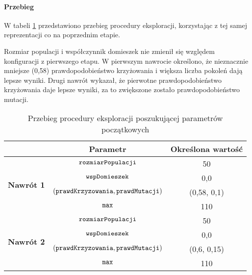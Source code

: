 \documentclass[./FM_mgr.tex]{subfiles}
\begin{document}
\paragraph{Przebieg}

W tabeli \ref{table:tsp_tweak_flow} przedstawiono przebieg procedury eksploracji, korzystając z tej samej reprezentacji co na poprzednim etapie.

Rozmiar populacji i współczynnik domieszek nie zmienił się względem konfiguracji z pierwszego etapu.
W pierwszym nawrocie określono, że nieznacznie mniejsze (0,58) prawdopodobieństwo krzyżowania i większa liczba pokoleń dają lepsze wyniki.
Drugi nawrót wykazał, że pierwotne prawdopodobieństwo krzyżowania daje lepsze wyniki, za to zwiększone zostało prawdopodobieństwo mutacji. 

\begin{table}[h]
	\caption{Przebieg procedury eksploracji poszukującej parametrów początkowych \label{table:tsp_tweak_flow}}
	\centering
	\begin{tabular}{c|c|c|}
		\cline{2-3}
		& {\bf Parametr}                                     & {\bf Określona wartość} \\ \hline
		\multicolumn{1}{|c|}{\multirow{4}{*}{{\bf Nawrót 1}}} & $\mathtt{rozmiarPopulacji}$                         & 50                      \\ \cline{2-3} 
		\multicolumn{1}{|c|}{}                                & $\mathtt{wspDomieszek}$                             & 0,0                     \\ \cline{2-3} 
		\multicolumn{1}{|c|}{}                                & $(\mathtt{prawdKrzyzowania}, \mathtt{prawdMutacji})$ & (0,58, 0,1)             \\ \cline{2-3} 
		\multicolumn{1}{|c|}{}                                & $\mathtt{max}$                                      & 110                     \\ \hline \hline
		\multicolumn{1}{|c|}{\multirow{4}{*}{{\bf Nawrót 2}}} & $\mathtt{rozmiarPopulacji}$                         & 50                      \\ \cline{2-3} 
		\multicolumn{1}{|c|}{}                                & $\mathtt{wspDomieszek}$                             & 0,0                     \\ \cline{2-3} 
		\multicolumn{1}{|c|}{}                                & $(\mathtt{prawdKrzyzowania}, \mathtt{prawdMutacji})$ & (0,6, 0,15)             \\ \cline{2-3} 
		\multicolumn{1}{|c|}{}                                & $\mathtt{max}$                                      & 110                     \\ \hline
	\end{tabular}
\end{table}	
\end{document}
